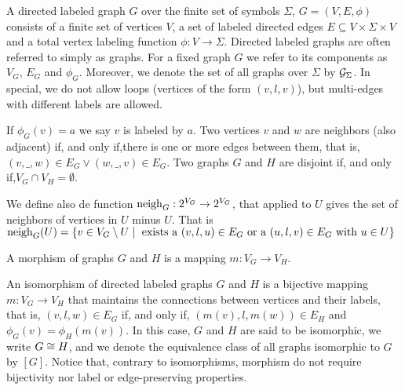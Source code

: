 \documentclass[]{report}
\begin{document}

\begin{definition}
	\label{def:graph}
	A directed labeled graph $G$ over the finite set of symbols $\Sigma$, $G = (V, E, \phi)$ consists of a finite set of vertices $V$, a set of labeled directed edges $E \subseteq V \times \Sigma \times V$ and a total vertex labeling function $\phi : V \to \Sigma$. Directed labeled graphs are often referred to simply as graphs. For a fixed graph $G$ we refer to its components as $V_G$, $E_G$ and $\phi_G$. Moreover, we denote the set of all graphs over $\Sigma$ by $\mathcal{G}_{\Sigma}$. In special, we do not allow loops (vertices of the form $(v,l,v)$), but multi-edges with different labels are allowed.
	
	If $\phi_G(v) = a$ we say $v$ is labeled by $a$. Two vertices $v$ and $w$ are neighbors (also adjacent) if, and only if,there is one or more edges between them, that is, $(v,\_,w) \in E_G \lor (w,\_,v) \in E_G$. Two graphs $G$ and $H$ are disjoint if, and only if,$V_G \cap V_H = \emptyset$.
	
	We define also de function $\operatorname{neigh}_{G}: 2^{V_G} \to 2^{V_G}$, that applied to $U$ gives the set of neighbors of vertices in $U$ minus $U$. That is $\operatorname{neigh}_{G}(U) = \{ v \in V_G \setminus U \; | \; \text{ exists a } (v,l,u) \in E_G \text{ or a } (u,l,v) \in E_G \text{ with } u \in U \}$
\end{definition}

\begin{definition}
	\label{def:morphism}
	A morphism of graphs $G$ and $H$ is a mapping $m: V_G \to V_H$.
\end{definition}

\begin{definition}
	An isomorphism of directed labeled graphs $G$ and $H$ is a bijective mapping $m: V_G \to V_H$ that maintains the connections between vertices and their labels, that is, $(v,l,w) \in E_G$ if, and only if,  $(m(v),l,m(w)) \in E_H$ and $\phi_G(v) = \phi_H(m(v))$. In this case, $G$ and $H$ are said to be isomorphic, we write $G \cong H$, and we denote the equivalence class of all graphs isomorphic to $G$ by $[G]$.
	Notice that, contrary to isomorphisms, morphism do not require bijectivity nor label or edge-preserving properties.
\end{definition}
\end{document}
